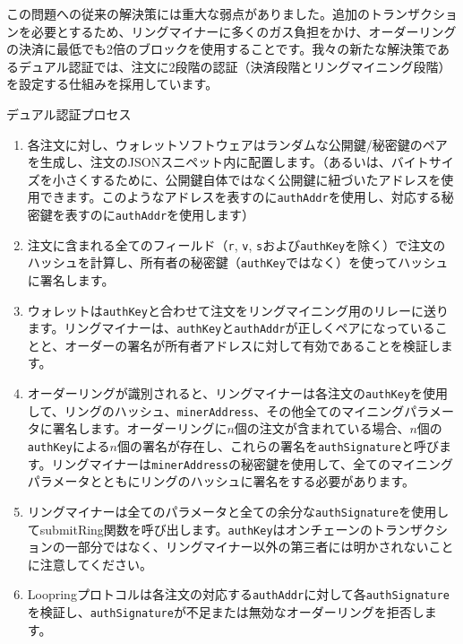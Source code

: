 \documentclass{article}
\begin{document}
\begin{multicols}{2}
この問題への従来の解決策には重大な弱点がありました。追加のトランザクションを必要とするため、リングマイナーに多くのガス負担をかけ、オーダーリングの決済に最低でも2倍のブロックを使用することです。我々の新たな解決策であるデュアル認証\cite{dualauthor}では、注文に2段階の認証（決済段階とリングマイニング段階）を設定する仕組みを採用しています。

デュアル認証プロセス

\begin{enumerate}

	\item 各注文に対し、ウォレットソフトウェアはランダムな公開鍵/秘密鍵のペアを生成し、注文のJSONスニペット内に配置します。（あるいは、バイトサイズを小さくするために、公開鍵自体ではなく公開鍵に紐づいたアドレスを使用できます。このようなアドレスを表すのに\verb|authAddr|を使用し、対応する秘密鍵を表すのに\verb|authAddr|を使用します）

	\item 注文に含まれる全てのフィールド（\verb|r|, \verb|v|, \verb|s|および\verb|authKey|を除く）で注文のハッシュを計算し、所有者の秘密鍵（\verb|authKey|ではなく）を使ってハッシュに署名します。

	\item ウォレットは\verb|authKey|と合わせて注文をリングマイニング用のリレーに送ります。リングマイナーは、\verb|authKey|と\verb|authAddr|が正しくペアになっていることと、オーダーの署名が所有者アドレスに対して有効であることを検証します。

	\item オーダーリングが識別されると、リングマイナーは各注文の\verb|authKey|を使用して、リングのハッシュ、\verb|minerAddress|、その他全てのマイニングパラメータに署名します。オーダーリングに$n$個の注文が含まれている場合、$n$個の\verb|authKey|による$n$個の署名が存在し、これらの署名を\verb|authSignature|と呼びます。リングマイナーは\verb|minerAddress|の秘密鍵を使用して、全てのマイニングパラメータとともにリングのハッシュに署名をする必要があります。

	\item リングマイナーは全てのパラメータと全ての余分な\verb|authSignature|を使用してsubmitRing関数を呼び出します。\verb|authKey|はオンチェーンのトランザクションの一部分ではなく、リングマイナー以外の第三者には明かされないことに注意してください。

	\item Loopringプロトコルは各注文の対応する\verb|authAddr|に対して各\verb|authSignature|を検証し、\verb|authSignature|が不足または無効なオーダーリングを拒否します。
 

\end{enumerate}
\end{multicols}
\end{document}
